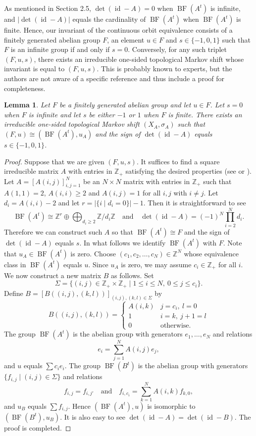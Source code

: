 \documentclass[11pt]{article}
\newtheorem{lemma}[theorem]{Lemma}
\theoremstyle{definition}
\numberwithin{equation}{section}
\newcommand{\BF}{\operatorname{BF}}
\newcommand{\id}{\operatorname{id}}
\newcommand{\Z}{\mathbb{Z}}
\begin{document}
As mentioned in Section 2.5, 
$\det(\id-A)=0$ when $\BF(A^t)$ is infinite, and 
$\lvert\det(\id-A)\rvert$ equals the cardinality of $\BF(A^t)$ 
when $\BF(A^t)$ is finite. 
Hence, our invariant of the continuous orbit equivalence consists of 
a finitely generated abelian group $F$, an element $u\in F$ 
and $s\in\{-1,0,1\}$ such that $F$ is an infinite group if and only if $s=0$. 
Conversely, for any such triplet $(F,u,s)$, 
there exists an irreducible one-sided topological Markov shift 
whose invariant is equal to $(F,u,s)$. 
This is probably known to experts, 
but the authors are not aware of a specific reference 
and thus include a proof for completeness. 

\begin{lemma}\label{range}
Let $F$ be a finitely generated abelian group and let $u\in F$. 
Let $s=0$ when $F$ is infinite and 
let $s$ be either $-1$ or $1$ when $F$ is finite. 
There exists an irreducible one-sided topological Markov shift 
$(X_A,\sigma_A)$ such that $(F,u)\cong (\BF(A^t),u_A)$ and 
the sign of $\det(\id-A)$ equals $s\in\{-1,0,1\}$. 
\end{lemma}
\begin{proof}
Suppose that we are given $(F,u,s)$. 
It suffices to find a square irreducible matrix $A$ with entries in $\Z_+$ 
satisfying the desired properties 
(see \cite[Section 2.3]{LM} or \cite[Remark 2.16]{CK80Invent}). 
Let $A=[A(i,j)]_{i,j=1}^N$ be an $N\times N$ matrix with entries in $\Z_+$ 
such that $A(1,1)=2$, $A(i,i)\geq2$ and $A(i,j)=1$ 
for all $i,j$ with $i\neq j$. 
Let $d_i=A(i,i)-2$ and let $r=\lvert\{i\mid d_i{=}0\}\rvert-1$. 
Then it is straightforward to see 
\[
\BF(A^t)\cong\Z^r\oplus\bigoplus_{d_i\geq2}\Z/d_i\Z
\quad\text{and}\quad 
\det(\id-A)=(-1)^N\prod_{i=2}^Nd_i. 
\]
Therefore we can construct such $A$ 
so that $\BF(A^t)\cong F$ and the sign of $\det(\id-A)$ equals $s$. 
In what follows we identify $\BF(A^t)$ with $F$. 
Note that $u_A\in\BF(A^t)$ is zero. 
Choose $(c_1,c_2,\dots,c_N)\in\Z^N$ 
whose equivalence class in $\BF(A^t)$ equals $u$. 
Since $u_A$ is zero, we may assume $c_i\in\Z_+$ for all $i$. 
We now construct a new matrix $B$ as follows. 
Set 
\[
\Sigma=\{(i,j)\in\Z_+\times\Z_+\mid1\leq i\leq N,\ 0\leq j\leq c_i\}. 
\]
Define $B=[B((i,j),(k,l))]_{(i,j),(k,l)\in\Sigma}$ by 
\[
B((i,j),(k,l))=\begin{cases}A(i,k)&j=c_i,\ l=0\\
1&i=k,\ j{+}1=l\\0&\text{otherwise. }\end{cases}
\]
The group $\BF(A^t)$ is the abelian group 
with generators $e_1,\dots,e_N$ and relations 
\[
e_i=\sum_{j=1}^NA(i,j)e_j, 
\]
and $u$ equals $\sum c_ie_i$. 
The group $\BF(B^t)$ is the abelian group 
with generators $\{f_{i,j}\mid(i,j)\in\Sigma\}$ and relations 
\[
f_{i,j}=f_{i,j'}\quad\text{and}\quad f_{i,c_i}=\sum_{k=1}^NA(i,k)f_{k,0}, 
\]
and $u_B$ equals $\sum f_{i,j}$. 
Hence $(\BF(A^t),u)$ is isomorphic to $(\BF(B^t),u_B)$. 
It is also easy to see $\det(\id-A)=\det(\id-B)$. 
The proof is completed. 
\end{proof}
\end{document}
